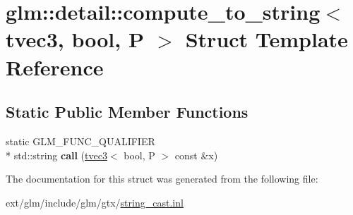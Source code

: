 \hypertarget{structglm_1_1detail_1_1compute__to__string_3_01tvec3_00_01bool_00_01_p_01_4}{\section{glm\-:\-:detail\-:\-:compute\-\_\-to\-\_\-string$<$ tvec3, bool, P $>$ Struct Template Reference}
\label{structglm_1_1detail_1_1compute__to__string_3_01tvec3_00_01bool_00_01_p_01_4}
}
\subsection*{Static Public Member Functions}
\begin{DoxyCompactItemize}
\item 
\hypertarget{structglm_1_1detail_1_1compute__to__string_3_01tvec3_00_01bool_00_01_p_01_4_abd2a1017b5cd9b3bcb514189dd4814b9}{static G\-L\-M\-\_\-\-F\-U\-N\-C\-\_\-\-Q\-U\-A\-L\-I\-F\-I\-E\-R \\*
std\-::string {\bfseries call} (\hyperlink{structglm_1_1tvec3}{tvec3}$<$ bool, P $>$ const \&x)}\label{structglm_1_1detail_1_1compute__to__string_3_01tvec3_00_01bool_00_01_p_01_4_abd2a1017b5cd9b3bcb514189dd4814b9}

\end{DoxyCompactItemize}


The documentation for this struct was generated from the following file\-:\begin{DoxyCompactItemize}
\item 
ext/glm/include/glm/gtx/\hyperlink{string__cast_8inl}{string\-\_\-cast.\-inl}\end{DoxyCompactItemize}
